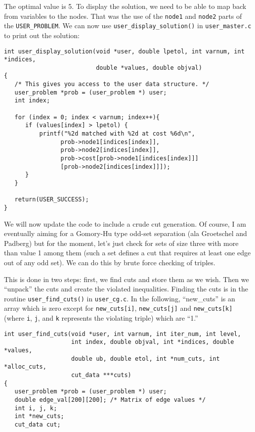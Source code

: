 \documentclass[11pt]{article}
\begin{document}
{The optimal value is 5. To display the solution, we need to be able to map
back from variables to the nodes. That was the use of the \texttt{node1} and
\texttt{node2} parts of the \texttt{USER\_PROBLEM}. We can now use
\texttt{user\_display\_solution()} in \texttt{user\_master.c} to print 
out the solution:

\begin{verbatim}
int user_display_solution(void *user, double lpetol, int varnum, int *indices,
                          double *values, double objval)
{
   /* This gives you access to the user data structure. */
   user_problem *prob = (user_problem *) user;
   int index;
 
   for (index = 0; index < varnum; index++){
      if (values[index] > lpetol) {
          printf("%2d matched with %2d at cost %6d\n",
                prob->node1[indices[index]],
                prob->node2[indices[index]],
                prob->cost[prob->node1[indices[index]]]
                [prob->node2[indices[index]]]);
      }	   
   }
   
   return(USER_SUCCESS);
}
\end{verbatim}

We will now update the code to include a crude cut generation. Of course, I am
eventually aiming for a Gomory-Hu type odd-set separation (ala Groetschel and
Padberg) but for the moment, let's just check for sets of size three with more
than value 1 among them (such a set defines a cut that requires at least one
edge out of any odd set). We can do this by brute force checking of triples.

This is done in two steps: first, we find cuts and store them as we wish. Then
we ``unpack'' the cuts and create the violated inequalities. Finding the cuts
is in the routine \texttt{user\_find\_cuts()} in \texttt{user\_cg.c}. In the
following, ``new\_cuts'' is an array which is zero except for 
\texttt{new\_cuts[i]}, \texttt{new\_cuts[j]} and \texttt{new\_cuts[k]} 
(where \texttt{i}, \texttt{j}, and \texttt{k} represents the violating triple) 
which are ``1.''

\begin{verbatim}
int user_find_cuts(void *user, int varnum, int iter_num, int level,
                   int index, double objval, int *indices, double *values,
                   double ub, double etol, int *num_cuts, int *alloc_cuts, 
                   cut_data ***cuts)
{
   user_problem *prob = (user_problem *) user;
   double edge_val[200][200]; /* Matrix of edge values */
   int i, j, k;
   int *new_cuts;
   cut_data cut;
   

\end{verbatim}}
\end{document}
